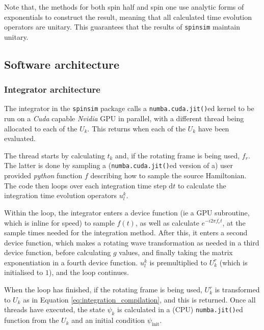 \documentclass{jors}
\begin{document}
			Note that, the methods for both spin half and spin one use analytic forms of exponentials to construct the result, meaning that all calculated time evolution operators are unitary. This guarantees that the results of \texttt{spinsim} maintain unitary. 

	\subsection*{Software architecture}
		\subsubsection*{Integrator architecture}
			The integrator in the \texttt{spinsim} package calls a \texttt{numba.cuda.jit()}ed kernel to be run on a \emph{Cuda} capable \emph{Nvidia} GPU in parallel, with a different thread being allocated to each of the \(U_k\). This returns when each of the \(U_k\) have been evaluated.
			
			The thread starts by calculating \(t_k\) and, if the rotating frame is being used, \(f_r\). The latter is done by sampling a (\texttt{numba.cuda.jit()}ed version of a) user provided \emph{python} function \(f\) describing how to sample the source Hamiltonian. The code then loops over each integration time step \(\mathrm{d}t\) to calculate the integration time evolution operators \(u^k_l\).
			
			Within the loop, the integrator enters a device function (ie a GPU subroutine, which is inline for speed) to sample \(f(t)\), as well as calculate \(e^{-i 2 \pi f_r t}\), at the sample times needed for the integration method. After this, it enters a second device function, which makes a rotating wave transformation as needed in a third device function, before calculating \(g\) values, and finally taking the matrix exponentiation in a fourth device function. \(u^k_l\) is premultiplied to \(U^r_k\) (which is initialised to \(1\)), and the loop continues.
			
			When the loop has finished, if the rotating frame is being used, \(U^r_k\) is transformed to \(U_k\) as in Equation \eqref{eq:integration_compilation}, and this is returned. Once all threads have executed, the state \(\psi_k\) is calculated in a (CPU) \texttt{numba.jit()}ed function from the \(U_k\) and an initial condition \(\psi_{\mathrm{init}}\).
	
	
\end{document}
